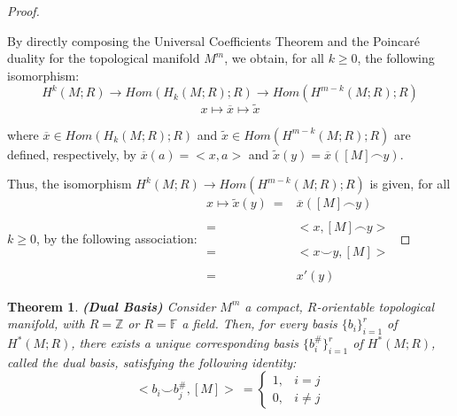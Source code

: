 \documentclass[12pt,oneside]{book}
\newtheorem{teo}    {Theorem}[chapter]
\newcommand{\Z}{\mathbb{Z}}
\newcommand{\F}{\mathbb{F}}
\newcommand{\ccup}{\smile}
\newcommand{\ccap}{\frown}
\newcommand{\wt}{\widetilde}
\begin{document}
    \begin{proof}
    
    \
    
    By directly composing the Universal Coefficients Theorem and the Poincaré duality for the 
    topological manifold $M^{m}$, we obtain, for all $k\geq 0$, the following isomorphism:
    $$ H^{k}(M;R)\to Hom(H_{k}(M;R);R)\to Hom(H^{m-k}(M;R);R) $$
    $$  x\mapsto\overline{x}\mapsto\wt{x} $$
    
    where $\overline{x}\in Hom(H_{k}(M;R);R)$ and $\wt{x}\in Hom(H^{m-k}(M;R);R)$ are defined, respectively, by $\overline{x}(a)=<x,a>$ and 
    $\wt{x}(y)=\overline{x}([M]\ccap y)$.
    
    Thus, the isomorphism $H^{k}(M;R)\to Hom(H^{m-k}(M;R);R)$ is given, for all $k\geq 0$, by the following association:
    \newline 
    $\begin{array}{rl}
            x\mapsto\wt{x}(y) \ = & \overline{x}([M]\ccap y) \\ 
            & \\
            = & <x,[M]\ccap y> \\
            & \\
            = & <x\ccup y,[M]> \\
            & \\
            = & x'(y)
        \end{array}$
    
    \end{proof}

    \begin{teo}\label{base_dual_2}{\bf (Dual Basis)}
        Consider $M^{m}$ a compact, $R$-orientable topological manifold, with $R=\Z$ or $R=\F$ a field. Then, for every basis 
        $\{b_{i}\}_{i=1}^{r}$ of $H^{*}(M;R)$, there exists a unique corresponding basis $\{b^{\#}_{i}\}_{i=1}^{r}$ of $H^{*}(M;R)$, called 
        the dual basis, satisfying the following identity:
        $$ <b_{i}\ccup b_{j}^{\#},[M]> \ =\left\{ \begin{array}{rl}
            1, & i=j \\
            0, & i\neq j
        \end{array}\right. $$
    \end{teo}
    
\end{document}
